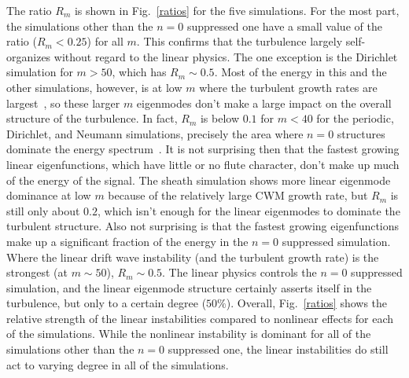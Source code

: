 \documentclass[showpacs,preprintnumbers,amsmath,amssymb,superscriptaddress,aip]{revtex4-1}
\begin{document}
The ratio $R_m$ is shown in Fig.~\ref{ratios} for the five simulations. For the most part, the simulations other than the $n=0$ suppressed one have a small value of the ratio ($R_m < 0.25$) for all $m$. 
This confirms that the turbulence largely self-organizes
without regard to the linear physics. The one exception is the Dirichlet simulation for $m > 50$, which has $R_m \sim 0.5$. Most of the energy in this and the other simulations, however, 
is at low $m$ where the turbulent growth rates are largest~\cite{friedman2012b}, so these larger $m$ eigenmodes don't make a large impact on the overall structure of the turbulence.
In fact, $R_m$ is below $0.1$ for $m<40$ for the periodic, Dirichlet, and Neumann simulations, precisely the area where
$n=0$ structures dominate the energy spectrum~\cite{friedman2012b}. It is not surprising then that the fastest growing linear eigenfunctions, which have little or no flute character,
don't make up much of the energy of the signal. The sheath simulation shows more linear eigenmode dominance at low $m$ because of the relatively large CWM growth rate, but $R_m$ is still only
about $0.2$, which isn't enough for the linear eigenmodes to dominate the turbulent structure.
Also not surprising is that the fastest growing eigenfunctions make up a significant fraction of the energy in the $n=0$ suppressed simulation. Where the linear drift wave instability 
(and the turbulent growth rate) is the strongest (at $m \sim 50$), $R_m \sim 0.5$. The linear physics controls the $n=0$ suppressed simulation, and the linear eigenmode structure certainly asserts itself
in the turbulence, but only to a certain degree ($50\%$). Overall, Fig.~\ref{ratios} shows the relative strength of the linear instabilities compared to nonlinear effects for each of the simulations.
While the nonlinear instability is dominant for all of the simulations other than the $n=0$ suppressed one, the linear instabilities do still act to varying degree in all of the simulations.
\end{document}
